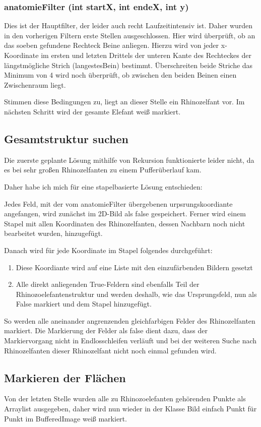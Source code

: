 		

		\subsubsection{anatomieFilter (int startX, int endeX, int y)}
		Dies ist der Hauptfilter, der leider auch recht Laufzeitintensiv ist.  Daher wurden in den vorherigen Filtern erste Stellen ausgeschlossen. Hier wird überprüft, ob an das soeben gefundene Rechteck Beine anliegen. Hierzu wird von jeder x-Koordinate im ersten und letzten Drittels der unteren Kante des Rechteckes der längstmögliche Strich (langestesBein) bestimmt. Überschreiten beide Striche das Minimum von 4 wird noch überprüft, ob zwischen den beiden Beinen einen Zwischenraum liegt.

		Stimmen diese Bedingungen zu, liegt an dieser Stelle ein Rhinozelfant vor. Im nächsten Schritt wird der gesamte Elefant weiß markiert.

		

	\subsection {Gesamtstruktur suchen}
	Die zuerste geplante Lösung mithilfe von Rekursion funktionierte leider nicht, da es bei sehr großen Rhinozelfanten zu einem Pufferüberlauf kam.

	Daher habe ich mich für eine stapelbasierte Lösung entschieden:

	Jedes Feld, mit der vom anatomieFilter übergebenen urpsrungskoordiante angefangen, wird zunächst im 2D-Bild als false gespeichert. Ferner wird einem Stapel mit allen Koordinaten des Rhinozelfanten, dessen Nachbarn noch nicht bearbeitet wurden, hinzugefügt.

	Danach wird für jede Koordinate im Stapel folgendes durchgeführt:

	\begin{enumerate}
		\item Diese Koordiante wird auf eine Liste mit den einzufärbenden Bildern gesetzt
		\item Alle direkt anliegenden True-Feldern sind ebenfalls Teil der Rhinozoelefantenstruktur und werden deshalb, wie das Ursprungsfeld, nun als False markiert und dem Stapel hinzugefügt.
	\end{enumerate}

	So werden alle aneinander angrenzenden gleichfarbigen Felder des Rhinozelfanten markiert. Die Markierung der Felder als false dient dazu, dass der Markiervorgang nicht in Endlosschleifen verläuft und bei der weiteren Suche nach Rhinozelfanten dieser Rhinozelfant nicht noch einmal gefunden wird.
	

	\subsection {Markieren der Flächen}

	Von der letzten Stelle wurden alle zu Rhinozoelefanten gehörenden Punkte als Arraylist ausgegeben, daher wird nun wieder in der Klasse Bild einfach Punkt für Punkt im BufferedImage weiß markiert.
		 